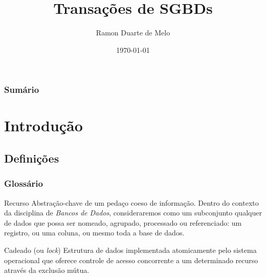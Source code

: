 \documentclass{beamer}
\title[Transações]{Transações de SGBDs} %
\author{Ramon Duarte de Melo} %
\institute[UFRJ] %
{
    Universidade Federal do Rio de Janeiro \\ %
    \medskip
    \textit{ramonduarte@poli.ufrj.br} %
}
\date{\today} %
\begin{document}
\begin{frame}
    \titlepage %
\end{frame}

\begin{frame}
    \frametitle{Sumário} %
    \tableofcontents %
\end{frame}


\section{Introdução} %

\subsection{Definições} %

\begin{frame}
    \frametitle{Glossário}
    
    \begin{block}{Recurso}
        Abstração-chave de um pedaço coeso de informação. Dentro do contexto da disciplina de \emph{Bancos de Dados}, consideraremos como um subconjunto qualquer de dados que possa ser nomeado, agrupado, processado ou referenciado: um registro, ou uma coluna, ou mesmo toda a base de dados. 
    \end{block}
    \begin{block}{Cadeado (ou \emph{lock})}
        Estrutura de dados implementada atomicamente pelo sistema operacional que oferece controle de acesso concorrente a um determinado recurso através da exclusão mútua.
    \end{block}
\end{frame}
\end{document}
